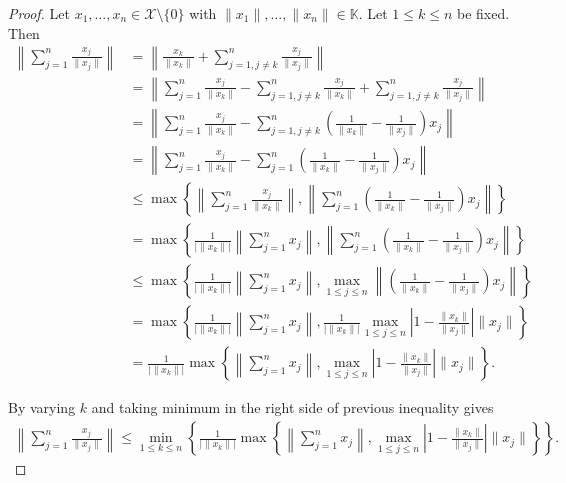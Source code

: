 \documentclass{amsart}
\begin{document}
\begin{proof}
Let $x_1, \dots, x_n \in \mathcal{X}\setminus\{0\}$ with $\|x_1\|, \dots, \|x_n\| \in \mathbb{K}$. Let $1\leq k \leq n$ be fixed. Then 
\begin{align*}
	\left\|\sum_{j=1}^{n}\frac{x_j}{\|x_j\|}\right\|&=\left\|\frac{x_k}{\|x_k\|}+\sum_{j=1, j \neq k}^{n}\frac{x_j}{\|x_j\|}\right\|\\
	&=\left\|\sum_{j=1}^{n}\frac{x_j}{\|x_k\|}-\sum_{j=1, j \neq k}^{n}\frac{x_j}{\|x_k\|}+\sum_{j=1, j \neq k}^{n}\frac{x_j}{\|x_j\|}\right\|\\
	&=\left\|\sum_{j=1}^{n}\frac{x_j}{\|x_k\|}-\sum_{j=1, j \neq k}^{n}\left(\frac{1}{\|x_k\|}-\frac{1}{\|x_j\|}\right)x_j\right\|\\
	&=\left\|\sum_{j=1}^{n}\frac{x_j}{\|x_k\|}-\sum_{j=1}^{n}\left(\frac{1}{\|x_k\|}-\frac{1}{\|x_j\|}\right)x_j\right\|\\
	&\leq \max \left\{\left\|\sum_{j=1}^{n}\frac{x_j}{\|x_k\|}\right\|, \left\|\sum_{j=1}^{n}\left(\frac{1}{\|x_k\|}-\frac{1}{\|x_j\|}\right)x_j\right\|\right\}\\
	&=\max \left\{\frac{1}{\big|\|x_k\|\big|}\left\|\sum_{j=1}^{n}x_j\right\|, \left\|\sum_{j=1}^{n}\left(\frac{1}{\|x_k\|}-\frac{1}{\|x_j\|}\right)x_j\right\|\right\}\\
	&\leq \max \left\{\frac{1}{\big|\|x_k\|\big|}\left\|\sum_{j=1}^{n}x_j\right\|, \max_{1\leq j \leq n} \left\|\left(\frac{1}{\|x_k\|}-\frac{1}{\|x_j\|}\right)x_j\right\|\right\}\\
	&= \max \left\{\frac{1}{\big|\|x_k\|\big|}\left\|\sum_{j=1}^{n}x_j\right\|, \frac{1}{\big|\|x_k\|\big|}\max_{1\leq j \leq n} \left|1-\frac{\|x_k\|}{\|x_j\|}\right|\|x_j\|\right\}\\
	&=\frac{1}{\big|\|x_k\|\big|} \max \left\{\left\|\sum_{j=1}^{n}x_j\right\|, \max_{1\leq j \leq n} \left|1-\frac{\|x_k\|}{\|x_j\|}\right|\|x_j\|\right\}.
\end{align*}	




By varying $k$ and taking minimum in the right side of previous inequality gives 
\begin{align*}
		\left\|\sum_{j=1}^{n}\frac{x_j}{\|x_j\|}\right\|\leq \min_{1\leq k \leq n}\left\{\frac{1}{\big|\|x_k\|\big|} \max \left\{\left\|\sum_{j=1}^{n}x_j\right\|, \max_{1\leq j \leq n} \left|1-\frac{\|x_k\|}{\|x_j\|}\right|\|x_j\|\right\}\right\}.
\end{align*}
\end{proof}
\end{document}
